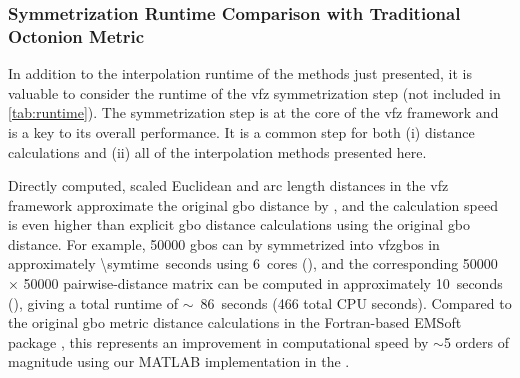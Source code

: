 \documentclass[final,twocolumn,12pt]{elsarticle}
\begin{document}
\subsubsection{Symmetrization Runtime Comparison with Traditional Octonion Metric}
\label{sec:results:efficiency:symruntime}
In addition to the interpolation runtime of the methods just presented, it is valuable to consider the runtime of the \gls{vfz} symmetrization step (not included in \cref{tab:runtime}). The symmetrization step is at the core of the \gls{vfz} framework and is a key to its overall performance. It is a common step for both (i) distance calculations and (ii) all of the interpolation methods presented here. 

Directly computed, scaled Euclidean and arc length distances in the \gls{vfz} framework approximate the original \gls{gbo} distance by \citet{francisGeodesicOctonionMetric2019}, and the calculation speed is even higher than explicit \gls{gbo} distance calculations using the original \gls{gbo} distance. For example, \num{50000} \glspl{gbo} can by symmetrized into \glspl{vfzgbo} in approximately \SI{\symtime}{seconds} using \SI{6}{cores} (), and the corresponding \num{50000} $\times$ \num{50000} pairwise-distance matrix can be computed in approximately \SI{10}{seconds} (), giving a total runtime of $\sim$~\SI{86}{seconds} (\num{466} total CPU seconds). Compared to the original \gls{gbo} metric distance calculations \cite{chesserLearningGrainBoundary2020} in the Fortran-based EMSoft package \cite{degraefEMSoft2020}, this represents an improvement in computational speed by $\sim$\num{5} orders of magnitude using our MATLAB implementation in the \vfzorepo{} \cite{bairdFiveDegreeofFreedom5DOF2020}.
\end{document}
